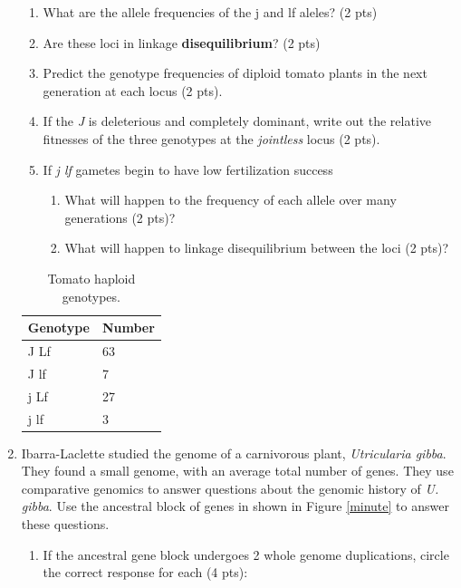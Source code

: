 \documentclass[]{article}
\begin{document}
\begin{enumerate}
\begin{enumerate}
\item What are the allele frequencies of the j and lf aleles? (2 pts) 
\item Are these loci in linkage {\bf disequilibrium}? (2 pts)
\item Predict the genotype frequencies of diploid tomato plants in the next generation at each locus (2 pts).
\item If the \emph{J} is deleterious and completely dominant, write out the relative fitnesses of the three genotypes at the \emph{jointless} locus (2 pts).
\item If \emph{j lf} gametes begin to have low fertilization success
\begin{enumerate}
\item What will happen to the frequency of each allele over many generations (2 pts)?
\item What will happen to linkage disequilibrium between the loci (2 pts)?
\end{enumerate} 
\end{enumerate}

\begin{table}[h]
\caption[]{Tomato haploid genotypes.}
\begin{center}
\begin{tabular}{ll}
Genotype & Number \\  \hline
J Lf & 63\\  
J lf & 7\\
j Lf & 27\\
j lf & 3\\

\end{tabular}
\end{center}
\label{tomaters}
\end{table}

\newpage
\item Ibarra-Laclette studied the genome of a carnivorous plant, \emph{Utricularia gibba}.  They found a small genome, with an average total number of genes.  They use comparative genomics to answer questions about the genomic history of \emph{U. gibba}.  Use the ancestral block of genes in shown in Figure \ref{minute} to answer these questions.

\begin{enumerate}
\item If the ancestral gene block undergoes 2 whole genome duplications, circle the correct response for each (4 pts):\\


\end{enumerate}
\end{enumerate}
\end{document}
